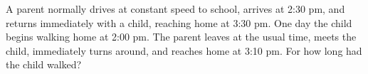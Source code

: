 A parent normally drives at constant speed to school, arrives at 2:30 pm, and returns immediately with a child, reaching home at 3:30 pm. One day the child begins walking home at 2:00 pm. The parent leaves at the usual time, meets the child, immediately turns around, and reaches home at 3:10 pm. For how long had the child walked?
